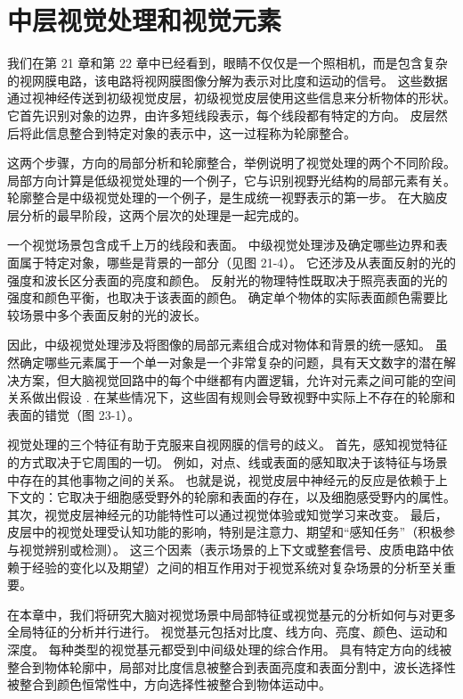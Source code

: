 \chapter{中层视觉处理和视觉元素} \label{chap:chap23}
我们在第 21 章和第 22 章中已经看到，眼睛不仅仅是一个照相机，而是包含复杂的视网膜电路，该电路将视网膜图像分解为表示对比度和运动的信号。 这些数据通过视神经传送到初级视觉皮层，初级视觉皮层使用这些信息来分析物体的形状。 它首先识别对象的边界，由许多短线段表示，每个线段都有特定的方向。 皮层然后将此信息整合到特定对象的表示中，这一过程称为轮廓整合。

这两个步骤，方向的局部分析和轮廓整合，举例说明了视觉处理的两个不同阶段。 局部方向计算是低级视觉处理的一个例子，它与识别视野光结构的局部元素有关。 轮廓整合是中级视觉处理的一个例子，是生成统一视野表示的第一步。 在大脑皮层分析的最早阶段，这两个层次的处理是一起完成的。

一个视觉场景包含成千上万的线段和表面。 中级视觉处理涉及确定哪些边界和表面属于特定对象，哪些是背景的一部分（见图 21-4）。 它还涉及从表面反射的光的强度和波长区分表面的亮度和颜色。 反射光的物理特性既取决于照亮表面的光的强度和颜色平衡，也取决于该表面的颜色。 确定单个物体的实际表面颜色需要比较场景中多个表面反射的光的波长。

因此，中级视觉处理涉及将图像的局部元素组合成对物体和背景的统一感知。 虽然确定哪些元素属于一个单一对象是一个非常复杂的问题，具有天文数字的潜在解决方案，但大脑视觉回路中的每个中继都有内置逻辑，允许对元素之间可能的空间关系做出假设 . 在某些情况下，这些固有规则会导致视野中实际上不存在的轮廓和表面的错觉（图 23-1）。

视觉处理的三个特征有助于克服来自视网膜的信号的歧义。 首先，感知视觉特征的方式取决于它周围的一切。 例如，对点、线或表面的感知取决于该特征与场景中存在的其他事物之间的关系。 也就是说，视觉皮层中神经元的反应是依赖于上下文的：它取决于细胞感受野外的轮廓和表面的存在，以及细胞感受野内的属性。 其次，视觉皮层神经元的功能特性可以通过视觉体验或知觉学习来改变。 最后，皮层中的视觉处理受认知功能的影响，特别是注意力、期望和“感知任务”（积极参与视觉辨别或检测）。 这三个因素（表示场景的上下文或整套信号、皮质电路中依赖于经验的变化以及期望）之间的相互作用对于视觉系统对复杂场景的分析至关重要。

在本章中，我们将研究大脑对视觉场景中局部特征或视觉基元的分析如何与对更多全局特征的分析并行进行。 视觉基元包括对比度、线方向、亮度、颜色、运动和深度。 每种类型的视觉基元都受到中间级处理的综合作用。 具有特定方向的线被整合到物体轮廓中，局部对比度信息被整合到表面亮度和表面分割中，波长选择性被整合到颜色恒常性中，方向选择性被整合到物体运动中。

